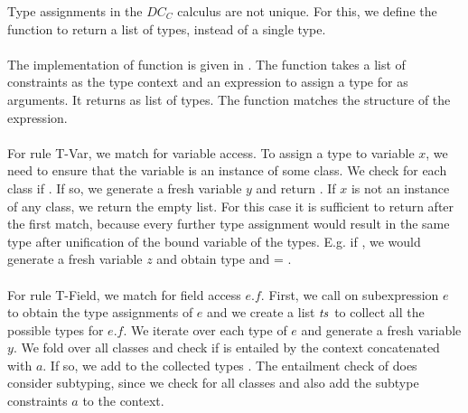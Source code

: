 Type assignments in the $DC_C$ calculus are not unique.
For this, we define the function 
to return a list of types, instead of a single type.\\
\\
The implementation of function 
is given in .
The function takes a list of constraints as the type context
and an expression to assign a type for as arguments.
It returns as list of types.
The function matches the structure of the expression.\\
\\
For rule T-Var, we match for variable access.
To assign a type to variable $x$, we need to ensure
that the variable is an instance of some class.
We check for each class  if .
If so, we generate a fresh variable $y$ and return .
If $x$ is not an instance of any class, we return the empty list.
For this case it is sufficient to return after the first match,
because every further type assignment
would result in the same type
after unification of the bound variable of the types.
E.g. if ,
we would generate a fresh variable $z$
and obtain type 
and  = .\\
\\
For rule T-Field, we match for field access $e.f$.
First, we call  on subexpression $e$ to obtain
the type assignments of $e$ and we create a list $\mathit{ts}$ to collect
all the possible types for $e.f$.
We iterate over each type  of $e$ and generate a fresh variable $y$.
We fold over all classes  and check if 
is entailed by the context concatenated with $a$.
If so, we add  to the collected types .
The entailment check of  does consider subtyping,
since we check for all classes and also add the subtype constraints $a$
to the context.


